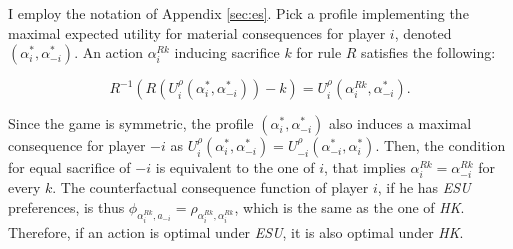 \begin{eqproof}
	I employ the notation of Appendix \ref{sec:es}. Pick a profile implementing the maximal expected utility for material consequences for player \(i\), denoted \(\left(\alpha^{*}_i, \alpha^{*}_{-i} \right)\). An action \(\alpha^{Rk}_i\) inducing sacrifice \(k\) for rule \(R\) satisfies the following:

	\[
		R^{-1} \left( R \left( U^{\rho}_i \left( \alpha^{*}_i, \alpha^{*}_{-i} \right) \right) - k \right) = U^{\rho}_i \left( \alpha^{Rk}_i, \alpha^{*}_{-i} \right) .
	\]

	Since the game is symmetric, the profile \(\left( \alpha^{*}_i, \alpha^{*}_{-i} \right)\) also induces a maximal consequence for player \(-i\) as \(U^{\rho}_i \left( \alpha^{*}_i, \alpha^{*}_{-i} \right) = U^{\rho}_{-i} \left( \alpha^{*}_{-i}, \alpha^{*}_{i} \right)\). Then, the condition for equal sacrifice of \(-i\) is equivalent to the one of \(i\), that implies \(\alpha^{Rk}_{i} = \alpha^{Rk}_{-i}\) for every \(k\). The counterfactual consequence function of player \(i\), if he has \textit{ESU} preferences, is thus \(\phi_{\alpha_i^{Rk}, a_{-i}} = \rho_{\alpha_i^{Rk}, \alpha_i^{Rk}} \), which is the same as the one of \textit{HK}. Therefore, if an action is optimal under \textit{ESU}, it is also optimal under \textit{HK}.
\end{eqproof}

